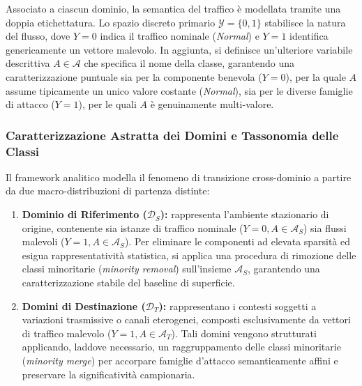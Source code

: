 Associato a ciascun dominio, la semantica del traffico è modellata tramite una doppia etichettatura. Lo spazio discreto primario $\mathcal{Y} = \{0,1\}$ stabilisce la natura del flusso, dove $Y = 0$ indica il traffico nominale (\textit{Normal}) e $Y = 1$ identifica genericamente un vettore malevolo. In aggiunta, si definisce un'ulteriore variabile descrittiva $A \in \mathcal{A}$ che specifica il nome della classe, garantendo una caratterizzazione puntuale sia per la componente benevola ($Y = 0$), per la quale $A$ assume tipicamente un unico valore costante (\textit{Normal}), sia per le diverse famiglie di attacco ($Y = 1$), per le quali $A$ è genuinamente multi-valore.

\subsubsection{Caratterizzazione Astratta dei Domini e Tassonomia delle Classi}
\label{subsubsec:caratterizzazione_domini}
Il framework analitico modella il fenomeno di transizione cross-dominio a partire da due macro-distribuzioni di partenza distinte:
\begin{enumerate}
    \item \textbf{Dominio di Riferimento ($\mathcal{D}_S$):} rappresenta l'ambiente stazionario di origine, contenente sia istanze di traffico nominale ($Y = 0, A \in \mathcal{A}_S$) sia flussi malevoli ($Y = 1, A \in \mathcal{A}_S$). Per eliminare le componenti ad elevata sparsità ed esigua rappresentatività statistica, si applica una procedura di rimozione delle classi minoritarie (\textit{minority removal}) sull'insieme $\mathcal{A}_S$, garantendo una caratterizzazione stabile del baseline di superficie.
    \item \textbf{Domini di Destinazione ($\mathcal{D}_T$):} rappresentano i contesti soggetti a variazioni trasmissive o canali eterogenei, composti esclusivamente da vettori di traffico malevolo ($Y = 1, A \in \mathcal{A}_T$). Tali domini vengono strutturati applicando, laddove necessario, un raggruppamento delle classi minoritarie (\textit{minority merge}) per accorpare famiglie d'attacco semanticamente affini e preservare la significatività campionaria.
\end{enumerate}

